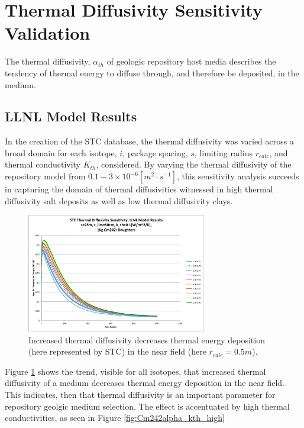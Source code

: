 \section{Thermal Diffusivity Sensitivity Validation}\label{sec:diffusivity}
The thermal diffusivity, $\alpha_{th}$ of geologic repository host media 
describes the tendency of thermal energy to diffuse through, and therefore be 
deposited, in the medium.

\subsection{LLNL Model Results}

In the creation of the \gls{STC} database, the thermal diffusivity was varied 
across a broad domain for each isotope, $i$, package spacing, $s$, limiting 
radius $r_{calc}$, and thermal conductivity $K_{th}$, considered.  By 
varying the thermal diffusivity of the repository model from $0.1-3\times 
10^{-6} [m^2\cdot s^{-1}]$, this sensitivity analysis succeeds in capturing the domain of 
thermal diffusivities witnessed in high thermal diffusivity salt deposits as 
well as low thermal diffusivity clays.

\begin{figure}[htbp!]
\begin{center}
\includegraphics[width=0.7\textwidth]{./chapters/demonstration/diffusivity/Cm242alpha_kth_low.eps}
\end{center}
\caption[$K_{th}$ Sensitivity to $\alpha_{th}$ for $k_{th}$]{Increased thermal diffusivity decreases thermal energy deposition 
(here represented by \gls{STC}) in the near field (here $r_{calc} = 0.5m$).}
\label{fig:Cm242alpha_kth_low}
\end{figure}


Figure \ref{fig:Cm242alpha_kth_low} shows the trend, visible for all isotopes, 
that increased thermal diffusivity of a medium decreases thermal energy 
deposition in the near field. This indicates, then that thermal diffusivity is 
an important parameter for repository geolgic medium selection. The effect is 
accentuated by high thermal conductivities, as seen in 
Figure \ref{fig:Cm242alpha_kth_high}

